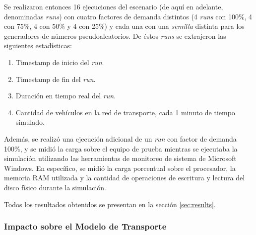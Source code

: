 Se realizaron entonces 16 ejecuciones del escenario (de aquí en adelante, denominadas \emph{runs}) con cuatro factores de demanda distintos (4 \emph{runs} con 100\%, 4 con 75\%, 4 con 50\% y 4 con 25\%) y cada una con una \emph{semilla} distinta para los generadores de números pseudoaleatorios. De éstos \emph{runs} se extrajeron las siguientes estadísticas:

\begin{enumerate}
    \item Timestamp de inicio del \emph{run}.
    \item Timestamp de fin del \emph{run}.
    \item Duración en tiempo real del \emph{run}.
    \item Cantidad de vehículos en la red de transporte, cada 1 minuto de tiempo simulado.
\end{enumerate}

Además, se realizó una ejecución adicional de un \emph{run} con factor de demanda 100\%, y se midió la carga sobre el equipo de prueba mientras se ejecutaba la simulación utilizando las herramientas de monitoreo de sistema de Microsoft Windows. En específico, se midió la carga porcentual sobre el procesador, la memoria RAM utilizada y la cantidad de operaciones de escritura y lectura del disco físico durante la simulación. 

Todos los resultados obtenidos se presentan en la sección \ref{sec:results}.

\subsubsection{Impacto sobre el Modelo de Transporte}
